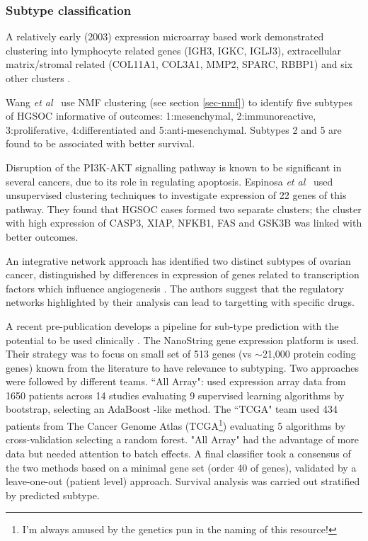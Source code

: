 \documentclass[draft,tikz, 12pt,a4paper,oneside,fleqn]{article}
\newcommand{\etal}{{\em et al\/}}
\begin{document}
\subsubsection{Subtype classification}
\label{sec-subtype-classification}

A relatively early (2003) expression microarray based work demonstrated clustering into lymphocyte related genes (IGH3, IGKC, IGLJ3), extracellular matrix/stromal related (COL11A1, COL3A1, MMP2, SPARC, RBBP1) and six other clusters \cite{Schaner2003}.

Wang \etal\ \cite{Wang2017c} use NMF clustering (see section \ref{sec-nmf}) to identify five subtypes of HGSOC informative of outcomes: 1:mesenchymal, 2:immunoreactive, 3:proliferative, 4:differentiated and 5:anti-mesenchymal.
Subtypes 2 and 5 are found to be associated with better survival.

Disruption of the PI3K-AKT signalling pathway is known to be significant in several cancers, due to its role in regulating apoptosis.  
Espinosa \etal\ \cite{Espinosa2011} used unsupervised clustering techniques to investigate expression of 22 genes of this pathway.  
They found that HGSOC cases formed two separate clusters; the cluster with high expression of CASP3, XIAP, NFKB1, FAS and GSK3B was linked with better outcomes.

An integrative network approach has identified two distinct subtypes of ovarian cancer, distinguished by differences in expression of genes related to transcription factors which influence angiogenesis \cite{Glass2015}.  The authors suggest that the regulatory networks highlighted by their analysis can lead to targetting with specific drugs.

A recent pre-publication develops a pipeline for sub-type prediction with the potential to be used clinically \cite{Talhouk2020}.
The NanoString gene expression platform is used.  Their strategy was to focus on small set of 513 genes (vs $\sim$21,000 protein coding genes) known from the literature to have relevance to subtyping.
Two approaches were followed by different teams.  ``All Array": used expression array data from 1650 patients across 14 studies evaluating 9 supervised learning algorithms by bootstrap, selecting an AdaBoost -like method. The ``TCGA" team used 434 patients from The Cancer Genome Atlas (TCGA\footnote{I'm always amused by the genetics pun in the naming of this resource!}) evaluating 5 algorithms by cross-validation selecting a random forest.  "All Array" had the advantage of more data but needed attention to batch effects. A final classifier took a consensus of the two methods based on a minimal gene set (order 40 of genes), validated by a leave-one-out (patient level) approach.  Survival analysis was carried out stratified by predicted subtype.
\end{document}
